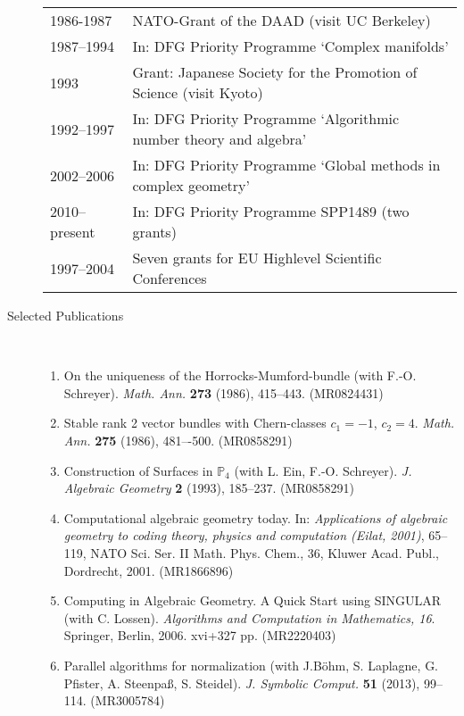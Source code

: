\begin{description}
\begin{tabular}{ll}
1986-1987 & NATO-Grant of the DAAD (visit UC Berkeley)\\
1987--1994& In: DFG Priority Programme `Complex manifolds'\\
\phantom{1992--}1993 & Grant: Japanese Society for the Promotion of Science (visit Kyoto)\\
1992--1997& In: DFG Priority Programme `Algorithmic number theory and algebra'\\
2002--2006& In: DFG Priority Programme `Global methods in complex geometry'\\
2010--present & In: DFG Priority Programme SPP1489 (two grants)\\
1997--2004 & Seven grants for EU Highlevel Scientific Conferences
\end{tabular}

\item[Selected Publications]\ 
\medskip\noindent
\begin{enumerate}[1.]

\item On the uniqueness of the Horrocks-Mumford-bundle (with F.-O. Schreyer).
\emph{Math. Ann.} {\bf{273}} (1986), 415--443.  (MR0824431)

\item Stable rank 2 vector bundles with Chern-classes $c_1=-1$, $c_2=4$. 
\emph{Math. Ann.}  {\bf{275}} (1986), 481–-500. (MR0858291)

\item Construction of Surfaces in $\mathbb{P}_4$ (with L. Ein, F.-O. Schreyer). 
\emph{J. Algebraic Geometry} {\bf{2}} (1993), 185--237. (MR0858291)

\item Computational algebraic geometry today. In: \emph{Applications of algebraic geometry 
to coding theory, physics and computation (Eilat, 2001)}, 65--119, 
NATO Sci. Ser. II Math. Phys. Chem., 36, Kluwer Acad. Publ., Dordrecht, 2001. (MR1866896)

\item 
Computing in Algebraic Geometry. A Quick Start using SINGULAR (with C. Lossen).
\emph{Algorithms and Computation in Mathematics, 16}.  Springer, Berlin, 2006. xvi+327 pp. (MR2220403)

\item Parallel algorithms for normalization (with J.B\"ohm, S. Laplagne, G. Pfister, A. Steenpa\ss, S. Steidel).
\emph{J. Symbolic Comput.} {\bf{51}} (2013), 99--114.  (MR3005784)


\end{enumerate}
\end{description}

